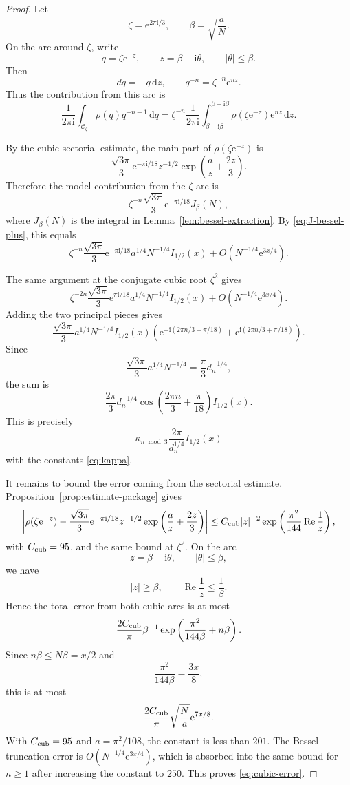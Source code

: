 \documentclass[11pt]{article}
\theoremstyle{remark}
\newcommand{\ii}{\mathrm i}
\newcommand{\e}{\mathrm e}
\newcommand{\dd}{\mathrm d}
\newcommand{\Repart}{\operatorname{Re}}
\begin{document}
\begin{proof}
Let
\[
\zeta=\e^{2\pi\ii/3},
\qquad
\beta=\sqrt{\frac{a}{N}}.
\]
On the arc around $\zeta$, write
\[
q=\zeta\e^{-z},
\qquad
z=\beta-\ii\theta,
\qquad
|\theta|\leq\beta.
\]
Then
\[
dq=-q\,\dd z,
\qquad
q^{-n}=\zeta^{-n}\e^{nz}.
\]
Thus the contribution from this arc is
\[
\frac1{2\pi\ii}
\int_{\mathcal C_\zeta}
\rho(q)q^{-n-1}\,\dd q
=
\zeta^{-n}
\frac1{2\pi\ii}
\int_{\beta-\ii\beta}^{\beta+\ii\beta}
\rho(\zeta\e^{-z})\e^{nz}\,\dd z.
\]

By the cubic sectorial estimate, the main part of $\rho(\zeta\e^{-z})$ is
\[
\frac{\sqrt{3\pi}}3
\e^{-\pi\ii/18}
z^{-1/2}
\exp\left(\frac{a}{z}+\frac{2z}{3}\right).
\]
Therefore the model contribution from the $\zeta$-arc is
\[
\zeta^{-n}
\frac{\sqrt{3\pi}}3
\e^{-\pi\ii/18}
J_\beta(N),
\]
where $J_\beta(N)$ is the integral in Lemma~\ref{lem:bessel-extraction}. By \eqref{eq:J-bessel-plus}, this equals
\[
\zeta^{-n}
\frac{\sqrt{3\pi}}3
\e^{-\pi\ii/18}
a^{1/4}N^{-1/4}I_{1/2}(x)
+
O\left(N^{-1/4}\e^{3x/4}\right).
\]

The same argument at the conjugate cubic root $\zeta^2$ gives
\[
\zeta^{-2n}
\frac{\sqrt{3\pi}}3
\e^{\pi\ii/18}
a^{1/4}N^{-1/4}I_{1/2}(x)
+
O\left(N^{-1/4}\e^{3x/4}\right).
\]
Adding the two principal pieces gives
\[
\frac{\sqrt{3\pi}}3
a^{1/4}N^{-1/4}
I_{1/2}(x)
\left(
\e^{-\ii(2\pi n/3+\pi/18)}
+
\e^{\ii(2\pi n/3+\pi/18)}
\right).
\]
Since
\[
\frac{\sqrt{3\pi}}3a^{1/4}N^{-1/4}
=
\frac{\pi}{3}d_n^{-1/4},
\]
the sum is
\[
\frac{2\pi}{3}d_n^{-1/4}
\cos\left(\frac{2\pi n}{3}+\frac\pi{18}\right)
I_{1/2}(x).
\]
This is precisely
\[
\kappa_{n\bmod3}
\frac{2\pi}{d_n^{1/4}}I_{1/2}(x)
\]
with the constants \eqref{eq:kappa}.

It remains to bound the error coming from the sectorial estimate. Proposition~\ref{prop:estimate-package} gives
\[
\left|
\rho(\zeta\e^{-z})
-
\frac{\sqrt{3\pi}}3
\e^{-\pi\ii/18}
z^{-1/2}
\exp\left(\frac{a}{z}+\frac{2z}{3}\right)
\right|
\leq
C_{\rm cub}|z|^{-2}
\exp\left(\frac{\pi^2}{144}\Repart\frac1z\right),
\]
with $C_{\rm cub}=95$, and the same bound at $\zeta^2$. On the arc
\[
z=\beta-\ii\theta,
\qquad
|\theta|\leq\beta,
\]
we have
\[
|z|\geq\beta,
\qquad
\Repart\frac1z\leq\frac1\beta.
\]
Hence the total error from both cubic arcs is at most
\[
\frac{2C_{\rm cub}}{\pi}\beta^{-1}
\exp\left(\frac{\pi^2}{144\beta}+n\beta\right).
\]
Since $n\beta\leq N\beta=x/2$ and
\[
\frac{\pi^2}{144\beta}=\frac{3x}{8},
\]
this is at most
\[
\frac{2C_{\rm cub}}{\pi}\sqrt{\frac{N}{a}}\e^{7x/8}.
\]
With $C_{\rm cub}=95$ and $a=\pi^2/108$, the constant is less than $201$. The Bessel-truncation error is $O(N^{-1/4}\e^{3x/4})$, which is absorbed into the same bound for $n\geq1$ after increasing the constant to $250$. This proves \eqref{eq:cubic-error}.
\end{proof}
\end{document}
